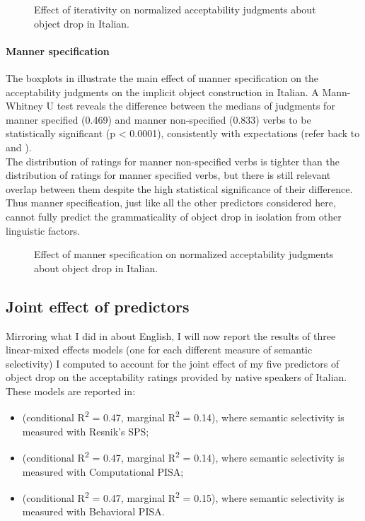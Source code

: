 \begin{figure}[htb]
\caption{Effect of iterativity on normalized acceptability judgments about object drop in Italian.}
    
\end{figure}

\paragraph{Manner specification}
The boxplots in  illustrate the main effect of manner specification on the acceptability judgments on the implicit object construction in Italian. A Mann-Whitney U test reveals the difference between the medians of judgments for manner specified (0.469) and manner non-specified (0.833) verbs to be statistically significant (p < 0.0001), consistently with expectations (refer back to  and ).\\
The distribution of ratings for manner non-specified verbs is tighter than the distribution of ratings for manner specified verbs, but there is still relevant overlap between them despite the high statistical significance of their difference. Thus manner specification, just like all the other predictors considered here, cannot fully predict the grammaticality of object drop in isolation from other linguistic factors.

\begin{figure}[htb]
\caption{Effect of manner specification on normalized acceptability judgments about object drop in Italian.}
    
\end{figure}


\subsection{Joint effect of predictors} 

Mirroring what I did in  about English, I will now report the results of three linear-mixed effects models (one for each different measure of semantic selectivity) I computed to account for the joint effect of my five predictors of object drop on the acceptability ratings provided by native speakers of Italian. These models are reported in:
\begin{itemize}
    \item {} (conditional R\textsuperscript{2} = 0.47, marginal R\textsuperscript{2} = 0.14), where semantic selectivity is measured with Resnik's SPS;
    \item {} (conditional R\textsuperscript{2} = 0.47, marginal R\textsuperscript{2} = 0.14), where semantic selectivity is measured with Computational PISA;
    \item {} (conditional R\textsuperscript{2} = 0.47, marginal R\textsuperscript{2} = 0.15), where semantic selectivity is measured with Behavioral PISA.
\end{itemize}

